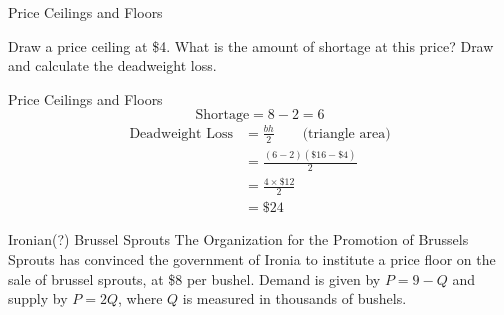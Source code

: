 \documentclass{beamer}
\begin{document}
\begin{frame}{Price Ceilings and Floors}
    \begin{center}
    \end{center}
    Draw a price ceiling at \$4. What is the amount of shortage at this price? Draw and calculate the deadweight loss.
\end{frame}

\begin{frame}{Price Ceilings and Floors}
    \[
        \text{Shortage} = 8 - 2 = \boxed{6}
    \]
    \[\begin{split}
        \text{Deadweight Loss} &= \frac{bh}{2} \qquad \text{(triangle area)} \\
        &= \frac{(6-2)(\$16-\$4)}{2} \\
        &= \frac{4 \times \$12}{2} \\
        &= \boxed{\$24}
    \end{split}\]
\end{frame}

\begin{frame}[t]{Ironian(?) Brussel Sprouts}
    The Organization for the Promotion of Brussels Sprouts has convinced the government of Ironia to institute a price floor on the sale of brussel sprouts, at \$8 per bushel. Demand is given by $P = 9 - Q$ and supply by $P = 2Q$, where $Q$ is measured in thousands of bushels.
\end{frame}
\end{document}

